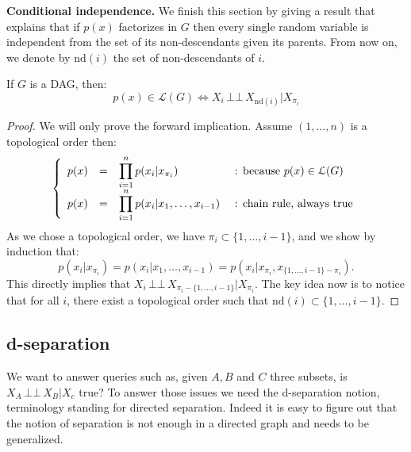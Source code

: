 \documentclass[12pt]{report}
\newcommand{\indep}{\ensuremath{\,\bot\!\!\!\bot\,}} %
\begin{document}
\textbf{Conditional independence. }We finish this section by giving a result that explains that if $p(x)$ factorizes in $G$ then every single random variable is independent from the set of its non-descendants given   its parents. From now on, we denote by $\text{nd}(i)$ the set of non-descendants of $i$.

\begin{proposition}
If $G$ is a DAG, then: 
\begin{equation}
p(x) \in \mathcal{L}(G) \Leftrightarrow X_i \indep X_{\text{nd}(i)} | X_{\pi_i}
\end{equation}
\end{proposition}
\begin{proof}
We will only prove the forward implication. Assume $(1,\dots, n)$ is a topological order then: 
\begin{equation*}
\left\{
\begin{array}{r l l l}
p(x) & = & \displaystyle \prod_{i=1}^n p(x_i | x_{\pi_i}) & \text{ : because $p(x)\in\mathcal{L}(G)$} \\
p(x) & = & \displaystyle \prod_{i=1}^n p(x_i | x_1, \dots, x_{i-1}) & \text{ : chain rule, always true} \\
\end{array}
\right.
\end{equation*}
As we chose a topological order, we have $\pi_i \subset \{1, \dots, i-1 \}$, and we show by induction that:
\begin{equation*}
p(x_i | x_{\pi_i}) = p(x_i | x_1, \dots, x_{i-1}) = p(x_i | x_{\pi_i}, x_{\{ 1,\dots, i-1\} - \pi_i}).
\end{equation*}
This directly implies that $X_i \indep X_{\pi_i - \{ 1,\dots, i-1\}} | X_{\pi_i}$. The key idea now is to notice that for all $i$, there exist a topological order such that $\text{nd}(i) \subset \{1,\dots, i-1\}$.
\end{proof}




\subsection{d-separation}

We want to answer queries such as, given $A, B$ and $C$ three subsets, is $X_A \indep X_B | X_c$ true? To answer those issues we need the d-separation notion, terminology standing for directed separation. Indeed it is easy to figure out that the notion of separation is not enough in a directed graph and needs to be generalized. 
\end{document}
